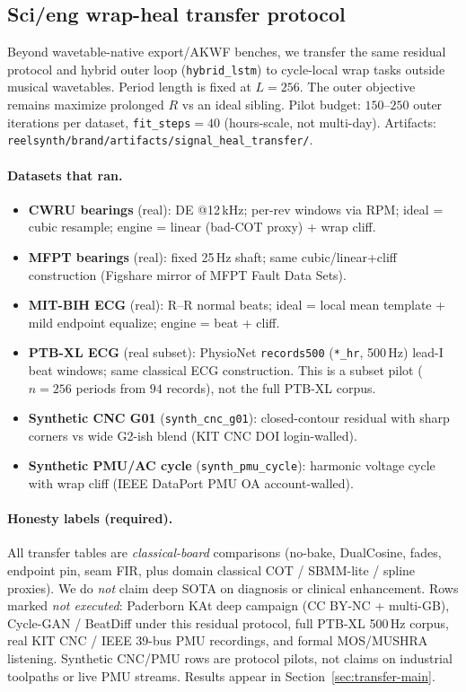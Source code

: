 
\subsection{Sci/eng wrap-heal transfer protocol}
\label{sec:transfer-protocol}

Beyond wavetable-native export/AKWF benches, we transfer the same residual protocol and hybrid outer loop
(\texttt{hybrid\_lstm}) to cycle-local wrap tasks outside musical wavetables.
Period length is fixed at $L{=}256$. The outer objective remains maximize prolonged $R$ vs an ideal sibling.
Pilot budget: $150$--$250$ outer iterations per dataset, \texttt{fit\_steps}${}={}40$ (hours-scale, not multi-day).
Artifacts: \texttt{reelsynth/brand/artifacts/signal\_heal\_transfer/}.

\paragraph{Datasets that ran.}
\begin{itemize}
  \item \textbf{CWRU bearings} (real): DE @12\,kHz; per-rev windows via RPM; ideal = cubic resample; engine = linear (bad-COT proxy) + wrap cliff.
  \item \textbf{MFPT bearings} (real): fixed 25\,Hz shaft; same cubic/linear+cliff construction (Figshare mirror of MFPT Fault Data Sets).
  \item \textbf{MIT-BIH ECG} (real): R--R normal beats; ideal = local mean template + mild endpoint equalize; engine = beat + cliff.
  \item \textbf{PTB-XL ECG} (real subset): PhysioNet \texttt{records500} (\texttt{*\_hr}, 500\,Hz) lead-I beat windows; same classical ECG construction. This is a subset pilot ($n{=}256$ periods from $94$ records), not the full PTB-XL corpus.
  \item \textbf{Synthetic CNC G01} (\texttt{synth\_cnc\_g01}): closed-contour residual with sharp corners vs wide G2-ish blend (KIT CNC DOI login-walled).
  \item \textbf{Synthetic PMU/AC cycle} (\texttt{synth\_pmu\_cycle}): harmonic voltage cycle with wrap cliff (IEEE DataPort PMU OA account-walled).
\end{itemize}

\paragraph{Honesty labels (required).}
All transfer tables are \emph{classical-board} comparisons (no-bake, DualCosine, fades, endpoint pin, seam FIR, plus domain classical COT / SBMM-lite / spline proxies).
We do \emph{not} claim deep SOTA on diagnosis or clinical enhancement.
Rows marked \emph{not executed}: Paderborn KAt deep campaign (CC BY-NC + multi-GB), Cycle-GAN / BeatDiff under this residual protocol, full PTB-XL 500\,Hz corpus, real KIT CNC / IEEE 39-bus PMU recordings, and formal MOS/MUSHRA listening.
Synthetic CNC/PMU rows are protocol pilots, not claims on industrial toolpaths or live PMU streams.
Results appear in Section~\ref{sec:transfer-main}.
